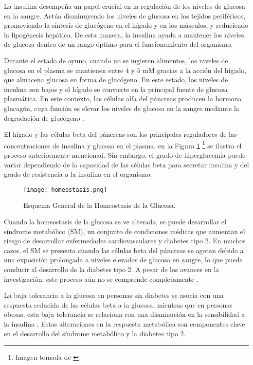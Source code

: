 La insulina desempeña un papel crucial en la regulación de los niveles de glucosa en la sangre. Actúa disminuyendo los niveles de glucosa en los tejidos periféricos, promoviendo la síntesis de glucógeno en el hígado y en los músculos, y reduciendo la lipogénesis hepática. De esta manera, la insulina ayuda a mantener los niveles de glucosa dentro de un rango óptimo para el funcionamiento del organismo.

Durante el estado de ayuno, cuando no se ingieren alimentos, los niveles de glucosa en el plasma se mantienen entre $4$ y $5$ mM gracias a la acción del hígado, que almacena glucosa en forma de glucógeno. En este estado, los niveles de insulina son bajos y el hígado se convierte en la principal fuente de glucosa plasmática. En este contexto, las células alfa del páncreas producen la hormona glucagón, cuya función es elevar los niveles de glucosa en la sangre mediante la degradación de glucógeno \cite{unamHomeostasis}.

El hígado y las células beta del páncreas son los principales reguladores de las concentraciones de insulina y glucosa en el plasma, en la Figura \ref{fig:homeostasis} \footnote{Imagen tomada de \cite{ImgHomeos}} se ilustra el proceso anteriormente mencionad. Sin embargo, el grado de hiperglucemia puede variar dependiendo de la capacidad de las células beta para secretar insulina y del grado de resistencia a la insulina en el organismo.

\begin{figure}[H]
    \centering
    \texttt{[image: homeostasis.png]}
    \caption{Esquema General de la Homeostasis de la Glucosa.}
    \label{fig:homeostasis}
\end{figure}

Cuando la homeostasis de la glucosa se ve alterada, se puede desarrollar el síndrome metabólico (SM), un conjunto de condiciones médicas que aumentan el riesgo de desarrollar enfermedades cardiovasculares y diabetes tipo 2. En muchos casos, el SM se presenta cuando las células beta del páncreas se agotan debido a una exposición prolongada a niveles elevados de glucosa en sangre, lo que puede conducir al desarrollo de la diabetes tipo 2. A pesar de los avances en la investigación, este proceso aún no se comprende completamente \cite{capitulo4Metabolic}.

La baja tolerancia a la glucosa en personas sin diabetes se asocia con una respuesta reducida de las células beta a la glucosa, mientras que en personas obesas, esta baja tolerancia se relaciona con una disminución en la sensibilidad a la insulina \cite{computational}. Estas alteraciones en la respuesta metabólica son componentes clave en el desarrollo del síndrome metabólico y la diabetes tipo 2.

